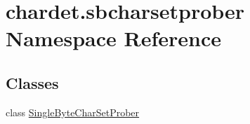 \hypertarget{namespacechardet_1_1sbcharsetprober}{}\section{chardet.\+sbcharsetprober Namespace Reference}
\label{namespacechardet_1_1sbcharsetprober}
\subsection*{Classes}
\begin{DoxyCompactItemize}
\item 
class \hyperlink{classchardet_1_1sbcharsetprober_1_1_single_byte_char_set_prober}{Single\+Byte\+Char\+Set\+Prober}
\end{DoxyCompactItemize}
